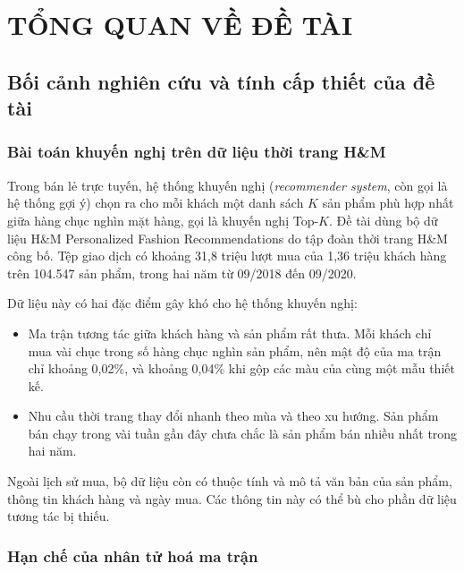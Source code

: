 \chapter{TỔNG QUAN VỀ ĐỀ TÀI}
\label{chap:tongquan}

\section{Bối cảnh nghiên cứu và tính cấp thiết của đề tài}
\label{sec:boicanh}

\subsection{Bài toán khuyến nghị trên dữ liệu thời trang H\&M}
\label{subsec:thuctrang}

Trong bán lẻ trực tuyến, hệ thống khuyến nghị (\textit{recommender system}, còn gọi là hệ thống gợi ý) chọn ra cho mỗi khách một danh sách $K$ sản phẩm phù hợp nhất giữa hàng chục nghìn mặt hàng, gọi là khuyến nghị Top-$K$. Đề tài dùng bộ dữ liệu H\&M Personalized Fashion Recommendations do tập đoàn thời trang H\&M công bố. Tệp giao dịch có khoảng 31,8 triệu lượt mua của 1,36 triệu khách hàng trên 104.547 sản phẩm, trong hai năm từ 09/2018 đến 09/2020.

Dữ liệu này có hai đặc điểm gây khó cho hệ thống khuyến nghị:
\begin{itemize}
    \item Ma trận tương tác giữa khách hàng và sản phẩm rất thưa. Mỗi khách chỉ mua vài chục trong số hàng chục nghìn sản phẩm, nên mật độ của ma trận chỉ khoảng 0,02\%, và khoảng 0,04\% khi gộp các màu của cùng một mẫu thiết kế.
    \item Nhu cầu thời trang thay đổi nhanh theo mùa và theo xu hướng. Sản phẩm bán chạy trong vài tuần gần đây chưa chắc là sản phẩm bán nhiều nhất trong hai năm.
\end{itemize}

Ngoài lịch sử mua, bộ dữ liệu còn có thuộc tính và mô tả văn bản của sản phẩm, thông tin khách hàng và ngày mua. Các thông tin này có thể bù cho phần dữ liệu tương tác bị thiếu.

\subsection{Hạn chế của nhân tử hoá ma trận}
\label{subsec:hanche_cf}

